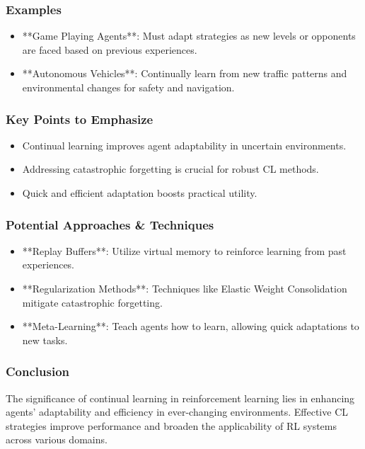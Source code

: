 \documentclass[aspectratio=169]{beamer}
\begin{document}
\begin{frame}[fragile]
    \frametitle{Examples}
    \begin{itemize}
        \item **Game Playing Agents**: Must adapt strategies as new levels or opponents are faced based on previous experiences.
        \item **Autonomous Vehicles**: Continually learn from new traffic patterns and environmental changes for safety and navigation.
    \end{itemize}
\end{frame}

\begin{frame}[fragile]
    \frametitle{Key Points to Emphasize}
    \begin{itemize}
        \item Continual learning improves agent adaptability in uncertain environments.
        \item Addressing catastrophic forgetting is crucial for robust CL methods.
        \item Quick and efficient adaptation boosts practical utility.
    \end{itemize}
\end{frame}

\begin{frame}[fragile]
    \frametitle{Potential Approaches \& Techniques}
    \begin{itemize}
        \item **Replay Buffers**: Utilize virtual memory to reinforce learning from past experiences.
        \item **Regularization Methods**: Techniques like Elastic Weight Consolidation mitigate catastrophic forgetting.
        \item **Meta-Learning**: Teach agents how to learn, allowing quick adaptations to new tasks.
    \end{itemize}
\end{frame}

\begin{frame}[fragile]
    \frametitle{Conclusion}
    The significance of continual learning in reinforcement learning lies in enhancing agents' adaptability and efficiency in ever-changing environments. Effective CL strategies improve performance and broaden the applicability of RL systems across various domains.
\end{frame}
\end{document}
